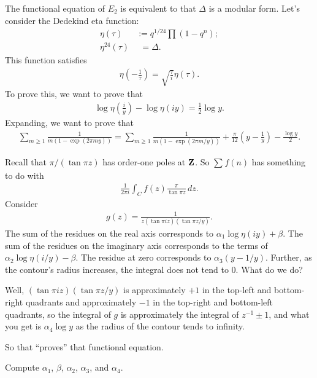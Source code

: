 \documentclass[11pt, oneside,margin=1in]{article}
\begin{document}
The functional equation of $E_2$ is equivalent to that $\Delta$ is a modular form. Let's consider the Dedekind eta function:
\begin{align*}
	\eta(\tau) &:= q^{1/24} \prod  (1-q^n); \\
	\eta^{24}(\tau)&\phantom{:} = \Delta.
\end{align*}
This function satisfies
\begin{align*}
	\eta\left( -\frac{1}{\tau} \right) = \sqrt{\frac{\tau}{i}} \eta (\tau). 
\end{align*}
To prove this, we want to prove that
\begin{align*}
	\log \eta \left( \frac{i}{y} \right) - \log \eta \left( iy \right) = \frac{1}{2}\log y.
\end{align*}
Expanding, we want to prove that
\begin{align*}
	\sum_{m\ge 1}^{} \frac{1}{m(1-\exp(2\pi my))} = \sum_{m\ge 1}^{} \frac{1}{m(1-\exp(2\pi m/y))} + \frac{\pi}{12} \left(y - \frac{1}{y} \right) - \frac{\log y}{2}.
\end{align*}

Recall that $\pi/(\tan \pi z)$ has order-one poles at $\mathbf Z$. So $\sum_{}^{} f(n)$ has something to do with 
\begin{align*}
	\frac{1}{2\pi i} \int_{C}^{} f(z) \frac{\pi}{\tan \pi z} \, dz. 
\end{align*}
Consider 
\begin{align*}
	g(z) =  \frac{1}{z(\tan \pi i z) (\tan \pi z/y)}.
\end{align*}
The sum of the residues on the real axis corresponds to $\alpha_1\log \eta(iy) + \beta$. The sum of the residues on the imaginary axis corresponds to the terms of $\alpha_2 \log \eta(i/y) - \beta$. The residue at zero corresponds to $\alpha_3(y - 1/y)$. Further, as the contour's radius increases, the integral does not tend to $0$. What do we do?

Well, $(\tan \pi i z)(\tan \pi z/y)$ is approximately $+1$ in the top-left and bottom-right quadrants and approximately $-1$ in the top-right and bottom-left quadrants, so the integral of $g$ is approximately the integral of $z^{-1} \pm 1$, and what you get is $\alpha_4\log y$ as the radius of the contour tends to infinity.

So that ``proves'' that functional equation.

\begin{exercise}\label{}\text{}
Compute $\alpha_1$, $\beta$, $\alpha_2$, $\alpha_3$, and $\alpha_4$.
\end{exercise}
\end{document}
